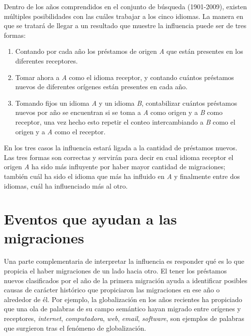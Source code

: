 Dentro de los años comprendidos en el conjunto de búsqueda
(1901-2009), existen múltiples posibilidades con las cuáles trabajar a los
cinco idiomas. La manera en que se tratará de llegar a un resultado que muestre
la influencia puede ser de tres formas:
\begin{enumerate}
\item Contando por cada año los préstamos de origen \textit{A} que están presentes en los diferentes receptores.
\item Tomar ahora a \textit{A} 
como el idioma receptor, y contando cuántos préstamos nuevos de diferentes orígenes están presentes en cada año. 
\item Tomando fijos un idioma \textit{A} y un idioma \textit{B},  contabilizar
cuántos préstamos nuevos por año se encuentran si se toma a \textit{A} como
origen y a \textit{B} como receptor,  una vez hecho esto  repetir el conteo
intercambiando a \textit{B} como el origen y a \textit{A} como el receptor. 
\end{enumerate}


En los tres casos la influencia estará ligada a la cantidad de préstamos
nuevos.  Las tres formas son correctas y servirán para decir en cual idioma
receptor  el origen \textit{A} ha sido más influyente por haber mayor cantidad
de migraciones; también cuál ha sido el idioma  que más ha influido en
\textit{A} y finalmente entre dos idiomas,  cuál ha influenciado más al otro. 
\section{Eventos que ayudan a las migraciones} %

Una parte complementaria de interpretar la influencia es responder qué es lo
que propicia el haber migraciones de un lado hacia otro.  El tener los
préstamos nuevos clasificados por el año de la primera migración ayuda a
identificar posibles causas de carácter histórico que propiciaron las
migraciones en ese año o alrededor de él.  Por ejemplo, la globalización en los
años recientes ha propiciado que una ola de palabras de su campo semántico
hayan migrado entre orígenes y receptores,  \textit{internet},
\textit{computadora}, \textit{web}, \textit{email},  \textit{software}, son
ejemplos de palabras que surgieron tras el fenómeno de globalización. 

